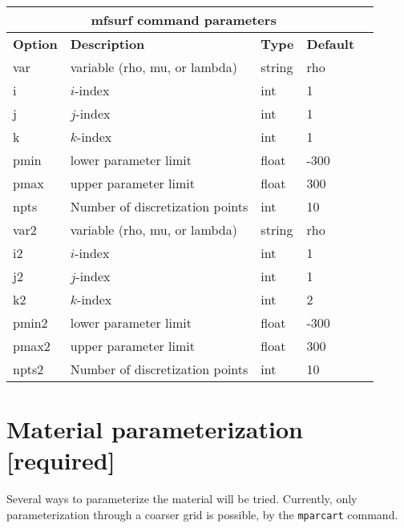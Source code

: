 \documentclass[12pt]{report}
\begin{document}
\begin{center}
\begin{tabular}{|l|p{6cm}|l|l|l|} \hline
\multicolumn{4}{|c|}{\bf mfsurf command parameters}\\ \hline
{\bf Option} & {\bf Description}          & {\bf Type} & {\bf Default} \\ \hline 
\hline
var     & variable (rho, mu, or lambda)      & string & rho \\ \hline
i       & $i$-index                          & int & 1 \\ \hline
j       & $j$-index                          & int & 1 \\ \hline
k       & $k$-index                          & int & 1 \\ \hline
pmin    & lower parameter limit              & float & -300 \\ \hline
pmax    & upper parameter limit              & float &  300 \\ \hline
npts    & Number of discretization points    & int & 10  \\ \hline
var2    & variable (rho, mu, or lambda)      & string & rho \\ \hline
i2       & $i$-index                          & int & 1 \\ \hline
j2       & $j$-index                          & int & 1 \\ \hline
k2       & $k$-index                          & int & 2 \\ \hline
pmin2    & lower parameter limit              & float & -300 \\ \hline
pmax2    & upper parameter limit              & float &  300 \\ \hline
npts2    & Number of discretization points    & int & 10  \\ \hline
\end{tabular}
\end{center}


\section{Material parameterization [required]}
Several ways to parameterize the material will be tried. Currently, only parameterization through a
coarser grid is possible, by the \verb+mparcart+ command.
\end{document}
